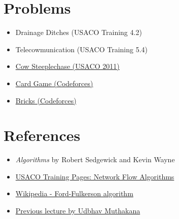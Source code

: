 \documentclass[12pt, letterpaper]{article}
\begin{document}
\section{Problems}
\begin{itemize}
    \item Drainage Ditches (USACO Training 4.2)
    \item Telecowmunication (USACO Training 5.4)
    \item \href{http://www.usaco.org/index.php?page=viewproblem2&cpid=93}{Cow Steeplechase (USACO 2011)}
    \item \href{https://codeforces.com/problemset/problem/808/F}{Card Game (Codeforces)}
    \item \href{https://codeforces.com/contest/1404/problem/E}{Bricks (Codeforces)}
\end{itemize}

\section{References}
\begin{itemize}
    \item \parbox{350pt}{\textit{Algorithms} by Robert Sedgewick and Kevin Wayne}
    \item \parbox{350pt}{\href{https://train.usaco.org}{USACO Training Pages: Network Flow Algorithms}}
    \item \parbox{350pt}{\href{https://en.wikipedia.org/wiki/Ford-Fulkerson_algorithm}{Wikipedia - Ford-Fulkerson algorithm}}
    \item \parbox{350pt}{\href{https://activities.tjhsst.edu/sct/lectures/1920/2020_4_30_Flow.pdf}{Previous lecture by Udbhav Muthakana}}
\end{itemize}
\end{document}
